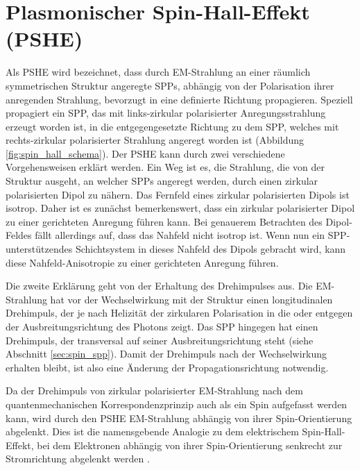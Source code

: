 \documentclass[a4paper, titlepage,  ngerman]{book}
\begin{document}
	\section{Plasmonischer Spin-Hall-Effekt (PSHE)}
	Als PSHE wird bezeichnet, dass durch EM-Strahlung an einer räumlich symmetrischen Struktur angeregte SPPs, abhängig von der Polarisation ihrer anregenden Strahlung, bevorzugt in eine definierte Richtung propagieren. Speziell propagiert ein SPP, das mit links-zirkular polarisierter Anregungsstrahlung erzeugt worden ist, in die entgegengesetzte Richtung zu dem SPP, welches mit rechts-zirkular polarisierter Strahlung angeregt worden ist (Abbildung \ref{fig:spin_hall_schema}). Der PSHE kann durch zwei verschiedene Vorgehensweisen erklärt werden. Ein Weg ist es, die Strahlung, die von der Struktur ausgeht, an welcher SPPs angeregt werden, durch einen zirkular polarisierten Dipol zu nähern. Das Fernfeld eines zirkular polarisierten Dipols ist isotrop. Daher ist es zunächst bemerkenswert, dass ein zirkular polarisierter Dipol zu einer gerichteten Anregung führen kann. Bei genauerem Betrachten des Dipol-Feldes fällt allerdings auf, dass das Nahfeld nicht isotrop ist. Wenn nun ein SPP-unterstützendes Schichtsystem in dieses Nahfeld des Dipols gebracht wird, kann diese Nahfeld-Anisotropie zu einer gerichteten Anregung führen.
	
	Die zweite Erklärung geht von der Erhaltung des Drehimpulses aus. Die EM-Strahlung hat vor der Wechselwirkung mit der Struktur einen longitudinalen Drehimpuls, der je nach Helizität der zirkularen Polarisation in die oder entgegen der Ausbreitungsrichtung des Photons zeigt. Das SPP hingegen hat einen Dreh\-impuls, der transversal auf seiner Ausbreitungsrichtung steht (siehe Abschnitt \ref{sec:spin_spp}). Damit der Drehimpuls nach der Wechselwirkung erhalten bleibt, ist also eine Änderung der Propagationsrichtung notwendig. 
	
	Da der Drehimpuls von zirkular polarisierter EM-Strahlung nach dem quantenmechanischen Korrespondenzprinzip auch als ein Spin aufgefasst werden kann, wird durch den PSHE EM-Strahlung abhängig von ihrer Spin-Orientierung abgelenkt. Dies ist die namensgebende Analogie zu dem elektrischem Spin-Hall-Effekt, bei dem Elektronen abhängig von ihrer Spin-Orientierung senkrecht zur Stromrichtung abgelenkt werden \cite{Inoue.2005}.
\end{document}
